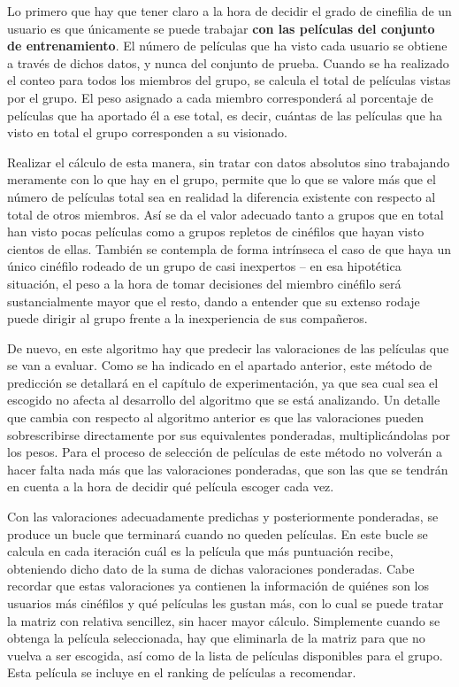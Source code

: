 Lo primero que hay que tener claro a la hora de decidir el grado de cinefilia de un usuario es que únicamente se puede trabajar \textbf{con las películas del conjunto de entrenamiento}. El número de películas que ha visto cada usuario se obtiene a través de dichos datos, y nunca del conjunto de prueba. Cuando se ha realizado el conteo para todos los miembros del grupo, se calcula el total de películas vistas por el grupo. El peso asignado a cada miembro corresponderá al porcentaje de películas que ha aportado él a ese total, es decir, cuántas de las películas que ha visto en total el grupo corresponden a su visionado.

Realizar el cálculo de esta manera, sin tratar con datos absolutos sino trabajando meramente con lo que hay en el grupo, permite que lo que se valore más que el número de películas total sea en realidad la diferencia existente con respecto al total de otros miembros. Así se da el valor adecuado tanto a grupos que en total han visto pocas películas como a grupos repletos de cinéfilos que hayan visto cientos de ellas. También se contempla de forma intrínseca el caso de que haya un único cinéfilo rodeado de un grupo de casi inexpertos -- en esa hipotética situación, el peso a la hora de tomar decisiones del miembro cinéfilo será sustancialmente mayor que el resto, dando a entender que su extenso rodaje puede dirigir al grupo frente a la inexperiencia de sus compañeros.

De nuevo, en este algoritmo hay que predecir las valoraciones de las películas que se van a evaluar. Como se ha indicado en el apartado anterior, este método de predicción se detallará en el capítulo de experimentación, ya que sea cual sea el escogido no afecta al desarrollo del algoritmo que se está analizando. Un detalle que cambia con respecto al algoritmo anterior es que las valoraciones pueden sobrescribirse directamente por sus equivalentes ponderadas, multiplicándolas por los pesos. Para el proceso de selección de películas de este método no volverán a hacer falta nada más que las valoraciones ponderadas, que son las que se tendrán en cuenta a la hora de decidir qué película escoger cada vez.

Con las valoraciones adecuadamente predichas y posteriormente ponderadas, se produce un bucle que terminará cuando no queden películas. En este bucle se calcula en cada iteración cuál es la película que más puntuación recibe, obteniendo dicho dato de la suma de dichas valoraciones ponderadas. Cabe recordar que estas valoraciones ya contienen la información de quiénes son los usuarios más cinéfilos y qué películas les gustan más, con lo cual se puede tratar la matriz con relativa sencillez, sin hacer mayor cálculo. Simplemente cuando se obtenga la película seleccionada, hay que eliminarla de la matriz para que no vuelva a ser escogida, así como de la lista de películas disponibles para el grupo. Esta película se incluye en el ranking de películas a recomendar.

